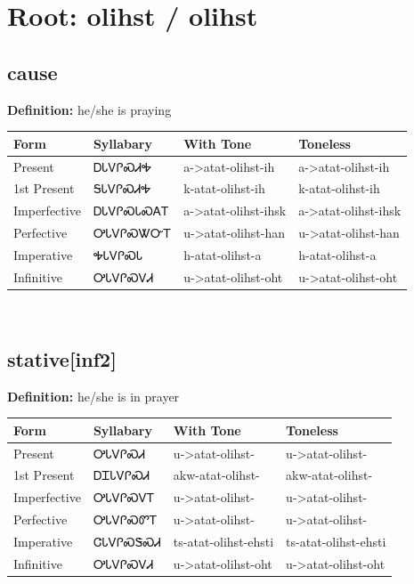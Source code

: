 \documentclass{article}%
\begin{document}
%
\normalsize%
\section*{Root: olihst / olihst}%
\subsection*{cause}%
\textbf{Definition: }%
he/she is praying%
\\[0.5em]%
\begin{tabular}{|l|l|l|l|}%
\hline%
\textbf{Form}&\textbf{Syllabary}&\textbf{With Tone}&\textbf{Toneless}\\%
\hline%
Present&ᎠᏓᏙᎵᏍᏗᎭ&a{-}>atat{-}olihst{-}ih&a{-}>atat{-}olihst{-}ih\\%
1st Present&ᎦᏓᏙᎵᏍᏗᎭ&k{-}atat{-}olihst{-}ih&k{-}atat{-}olihst{-}ih\\%
Imperfective&ᎠᏓᏙᎵᏍᏓᏍᎪᎢ&a{-}>atat{-}olihst{-}ihsk&a{-}>atat{-}olihst{-}ihsk\\%
Perfective&ᎤᏓᏙᎵᏍᏔᏅᎢ&u{-}>atat{-}olihst{-}han&u{-}>atat{-}olihst{-}han\\%
Imperative&ᎭᏓᏙᎵᏍᏓ&h{-}atat{-}olihst{-}a&h{-}atat{-}olihst{-}a\\%
Infinitive&ᎤᏓᏙᎵᏍᏙᏗ&u{-}>atat{-}olihst{-}oht&u{-}>atat{-}olihst{-}oht\\%
\hline%
\end{tabular}%
\\[1em]%
\subsection*{stative[inf2]}%
\textbf{Definition: }%
he/she is in prayer%
\\[0.5em]%
\begin{tabular}{|l|l|l|l|}%
\hline%
\textbf{Form}&\textbf{Syllabary}&\textbf{With Tone}&\textbf{Toneless}\\%
\hline%
Present&ᎤᏓᏙᎵᏍᏗ&u{-}>atat{-}olihst{-}&u{-}>atat{-}olihst{-}\\%
1st Present&ᎠᏆᏓᏙᎵᏍᏗ&akw{-}atat{-}olihst{-}&akw{-}atat{-}olihst{-}\\%
Imperfective&ᎤᏓᏙᎵᏍᏙᎢ&u{-}>atat{-}olihst{-}&u{-}>atat{-}olihst{-}\\%
Perfective&ᎤᏓᏙᎵᏍᏛᎢ&u{-}>atat{-}olihst{-}&u{-}>atat{-}olihst{-}\\%
Imperative&ᏣᏓᏙᎵᏍᏕᏍᏗ&ts{-}atat{-}olihst{-}ehsti&ts{-}atat{-}olihst{-}ehsti\\%
Infinitive&ᎤᏓᏙᎵᏍᏙᏗ&u{-}>atat{-}olihst{-}oht&u{-}>atat{-}olihst{-}oht\\%
\hline%
\end{tabular}%
\\[1em]%
\end{document}
